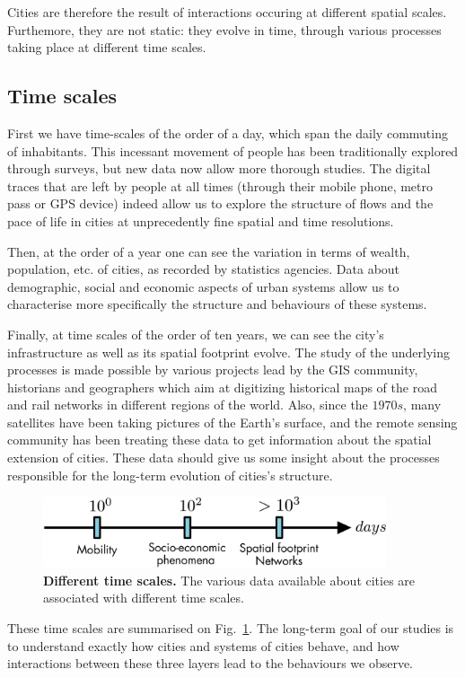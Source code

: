 Cities are therefore the result of interactions occuring at different spatial
scales. Furthemore, they are not static: they evolve in time, through various
processes taking place at different time scales.



\subsection{Time scales}
\label{ssub:time_scales}

First we have time-scales of the order of a day, which span the daily commuting
of inhabitants. This incessant movement of people has been traditionally
explored through surveys, but new data now allow more thorough studies. The
digital traces that are left by people at all times (through their mobile phone,
metro pass or GPS device) indeed allow us to explore the structure of flows and
the pace of life in cities at unprecedently fine spatial and time resolutions.

Then, at the order of a year one can see the variation in terms of wealth,
population, etc. of cities, as recorded by statistics agencies. Data about
demographic, social and economic aspects of urban systems allow us to
characterise more specifically the structure and behaviours of these systems.

Finally, at time scales of the order of ten years, we can see the city's
infrastructure as well as its spatial footprint evolve. The study of the
underlying processes is made possible by various projects lead by the GIS
community, historians and geographers which aim at digitizing historical maps of
the road and rail networks in different regions of the world. Also, since the
$1970s$, many satellites have been taking pictures of the Earth's surface, and
the remote sensing community has been treating these data to get information
about the spatial extension of cities. These data should give us some insight
about the processes responsible for the long-term evolution of cities's
structure.\\

\begin{figure}[!h]
    \centering
    \includegraphics[width=0.9\textwidth]{./gfx/chapter-intro/time_scales.pdf}
    \caption{{\bf Different time scales.} The various data available about
    cities are associated with different time scales.\label{fig:timescale}}
\end{figure}

These time scales are summarised on Fig.~\ref{fig:timescale}. The long-term goal
of our studies is to understand exactly how cities and systems of cities behave,
and how interactions between these three layers lead to the behaviours we
observe. 
